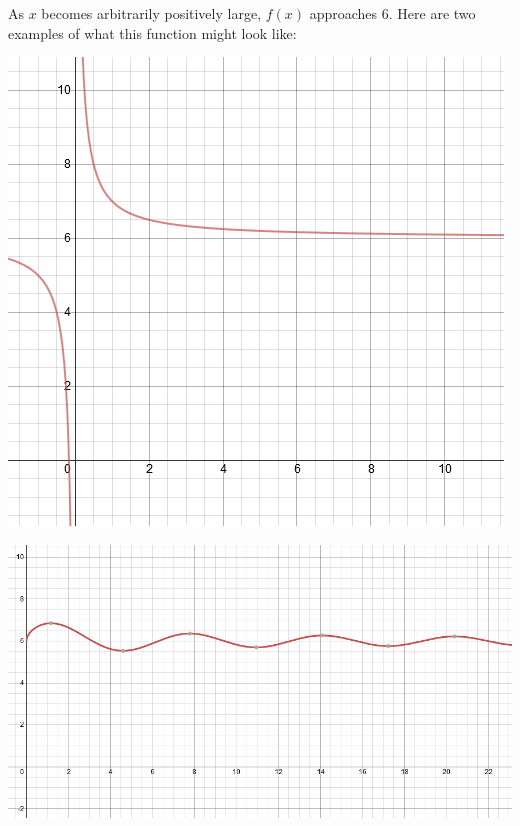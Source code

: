 \documentclass[nooutcomes]{ximera}
\begin{document}
\begin{problem}
	\begin{freeResponse}
	As $x$ becomes arbitrarily positively large, $f(x)$ approaches $6$.  Here are two examples of what this function might look like:
	\begin{image}
	\includegraphics[scale=.5]{figure8.png}
	\end{image}
	\begin{image}
	\includegraphics[scale=.5]{figure9}
	\end{image}
	\end{freeResponse}

\end{problem}
\end{document}
